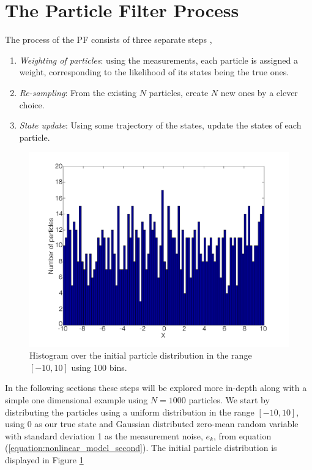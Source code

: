 \documentclass{LTHthesis}
\begin{document}
\section{The Particle Filter Process}
\label{sec:PF_process}
%
The process of the PF consists of three separate steps \cite{gson12}, 
\begin{enumerate}
\item \emph{Weighting of particles}: using the measurements, each particle is assigned a weight, corresponding to the likelihood of its states being the true ones.
\item \emph{Re-sampling}: From the existing $N$ particles, create $N$ new ones by a clever choice.
\item \emph{State update}: Using some trajectory of the states, update the states of each particle.
\end{enumerate}
%
\begin{figure}[!hbt]

\includegraphics[width=1\textwidth ]{images/PF/hist_ini_dist}
\caption{Histogram over the initial particle distribution in the range $[-10,10]$ using 100 bins.}\label{hist_ini_dist}
\end{figure}
%
In the following sections these steps will be explored more in-depth along with a simple one dimensional example using $N=1000$ particles. We start by distributing the particles using a uniform distribution in the range $[-10,10]$, using $0$ as our true state and Gaussian distributed zero-mean random variable with standard deviation 1 as the measurement noise, $e_k$, from equation (\ref{equation:nonlinear_model_second}). The initial particle distribution is displayed in Figure  \ref{hist_ini_dist}
%
\end{document}
